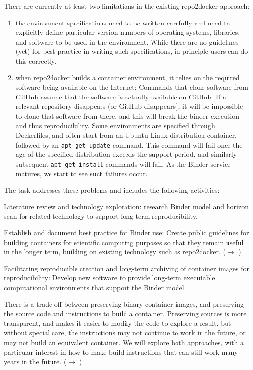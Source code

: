 \begin{task}[
  title=Archiving software environments for reproducible computation,
  id=reproducibility,
  lead=MP,
  PM=42,
  wphases={0-36},
  partners={SRL,QS,UIO}
]
  There are currently at least two limitations in the existing
  repo2docker approach:
\begin{enumerate}
\item the environment specifications need to be written carefully and
  need to explicitly define particular version numbers of operating
  systems, libraries, and software to be used in the
  environment. While there are no guidelines (yet) for best practice
  in writing such specifications, in principle users can do this
  correctly.
\item when repo2docker builds a container environment, it relies on
  the required software being available on the Internet: Commands that
  clone software from GitHub assume that the software is actually
  available on GitHub. If a relevant repository disappears (or GitHub
  disappears), it will be impossible to clone that software from
  there, and this will break the binder execution and thus
  reproducibility. Some environments are specified through
  Dockerfiles, and often start from an Ubuntu Linux distribution
  container, followed by an \texttt{apt-get update} command. This
  command will fail once the age of the specified distribution exceeds
  the support period, and similarly subsequent \texttt{apt-get
    install} commands will fail. As the Binder service matures, we
  start to see such failures occur.
\end{enumerate}

The task addresses these problems and includes the following activities:
\begin{compactitem}

\item Literature review and technology exploration: research Binder
  model and horizon scan for related technology to support long term
  reproducibility.

\item Establish and document best practice for Binder use: Create
  public guidelines for building containers for scientific computing
  purposes so that they remain useful in the longer term, building on
  existing technology such as repo2docker. ($\rightarrow$
  )

\item Facilitating reproducible creation and long-term archiving of
  container images for reproducibility: Develop new software to
  provide long-term executable computational environments that support
  the Binder model.

  There is a trade-off between preserving binary container images, and
  preserving the source code and instructions to build a container.
  Preserving sources is more transparent, and makes it easier to
  modify the code to explore a result, but without special care, the
  instructions may not continue to work in the future, or may not
  build an equivalent container.  We will explore both approaches,
  with a particular interest in how to make build instructions that
  can still work many years in the future.  ($\rightarrow$
  )


\end{compactitem}
\end{task}
